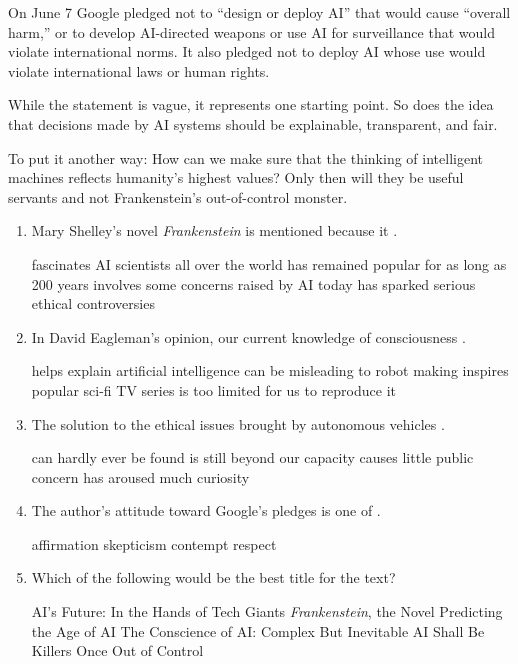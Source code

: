 On June 7 Google pledged not to ``design or deploy AI'' that would
cause ``overall harm,'' or to develop AI-directed weapons or use AI for
surveillance that would violate international norms. It also pledged not
to deploy AI whose use would violate international laws or human rights.



While the statement is vague, it represents one starting point. So
does the idea that decisions made by AI systems should be explainable,
transparent, and fair. 


To put it another way: How can we make sure
that the thinking of intelligent machines reflects humanity's highest
values? Only then will they be useful servants and not Frankenstein's
out-of-control monster.


\begin{enumerate}[resume]
	\item
Mary Shelley's novel \emph{Frankenstein} is mentioned because it \lineread.

\fourchoices
{fascinates AI scientists all over the world}
{has remained popular for as long as 200 years}
{involves some concerns raised by AI today}
{has sparked serious ethical controversies}



\item
In David Eagleman's opinion, our current knowledge of consciousness \lineread.

\fourchoices
{helps explain artificial intelligence}
{can be misleading to robot making}
{inspires popular sci-fi TV series}
{is too limited for us to reproduce it}


\item
The solution to the ethical issues brought by autonomous vehicles \lineread.

\fourchoices
{can hardly ever be found}
{is still beyond our capacity}
{causes little public concern}
{has aroused much curiosity}


\item
The author's attitude toward Google's pledges is one of \lineread.


\fourchoices
{affirmation}
{skepticism}
{contempt}
{respect}




\item
Which of the following would be the best title for the text?

\fourchoices
{AI's Future: In the Hands of Tech Giants}
{\emph{Frankenstein}, the Novel Predicting the Age of AI}
{The Conscience of AI: Complex But Inevitable}
{AI Shall Be Killers Once Out of Control}

\end{enumerate}


